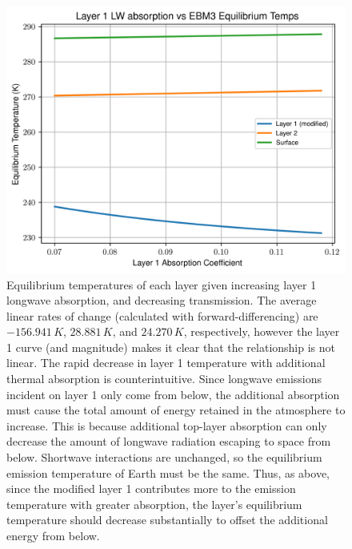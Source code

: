 \documentclass[12pt]{article}
\begin{document}
\begin{figure}[h!]\label{dtdal1}
    \centering
    \includegraphics[width=.70\linewidth]{ebm3hf_dTda_l1.png}
    \caption{Equilibrium temperatures of each layer given increasing layer 1 longwave absorption, and decreasing transmission. The average linear rates of change (calculated with forward-differencing) are $-156.941\,\si{K}$, $28.881\,\si{K}$, and $24.270\,\si{K}$, respectively, however the layer 1 curve (and magnitude) makes it clear that the relationship is not linear. The rapid decrease in layer 1 temperature with additional thermal absorption is counterintuitive. Since longwave emissions incident on layer 1 only come from below, the additional absorption must cause the total amount of energy retained in the atmosphere to increase. This is because additional top-layer absorption can only decrease the amount of longwave radiation escaping to space from below. Shortwave interactions are unchanged, so the equilibrium emission temperature of Earth must be the same. Thus, as above, since the modified layer 1 contributes more to the emission temperature with greater absorption, the layer's equilibrium temperature should decrease substantially to offset the additional energy from below.}
\end{figure}
\end{document}
